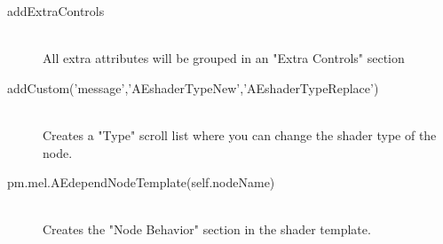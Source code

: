 \begin{description}
\item[addExtraControls] \hfill \\
All extra attributes will be grouped in an "Extra Controls" section


\item[addCustom('message','AEshaderTypeNew','AEshaderTypeReplace')] \hfill \\
Creates a "Type" scroll list where you can change the shader type of the node.

\item[pm.mel.AEdependNodeTemplate(self.nodeName)] \hfill \\
Creates the "Node Behavior" section in the shader template.

\end{description}


